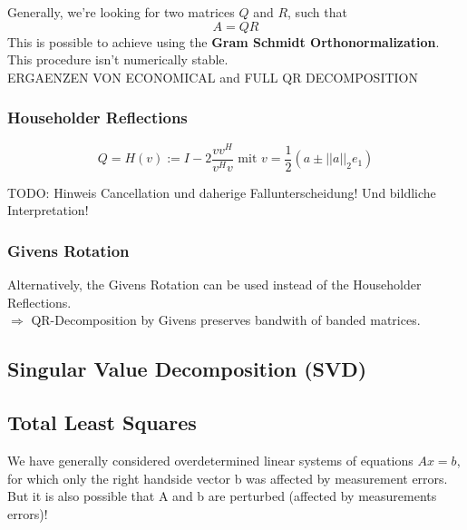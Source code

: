 \documentclass[12pt, a4paper]{article}
\begin{document}
\vspace{10mm}


Generally, we're looking for two matrices $Q$ and $R$, such that
\begin{equation*}
	A = QR
\end{equation*}
This is possible to achieve using the \textbf{Gram Schmidt Orthonormalization}. This procedure isn't numerically stable. \\

ERGAENZEN VON ECONOMICAL and FULL QR DECOMPOSITION

\subsubsection{Householder Reflections}

\begin{tcolorbox}
\begin{equation*}
	Q = H(v) := I - 2\frac{vv^H}{v^Hv}\text{ mit } v = \frac{1}{2}(a \pm ||a||_2 e_1)
\end{equation*}
\end{tcolorbox}

TODO: Hinweis Cancellation und daherige Fallunterscheidung! Und bildliche Interpretation!

\subsubsection{Givens Rotation}

Alternatively, the Givens Rotation can be used instead of the Householder Reflections. \\

$\Rightarrow$ QR-Decomposition by Givens preserves bandwith of banded matrices.
 
\subsection{Singular Value Decomposition (SVD)}




\subsection{Total Least Squares}
We have generally considered overdetermined linear systems of equations $Ax = b$, for which only the right handside vector b was affected by measurement errors. But it is also possible that A and b are perturbed (affected by measurements errors)!
\end{document}
